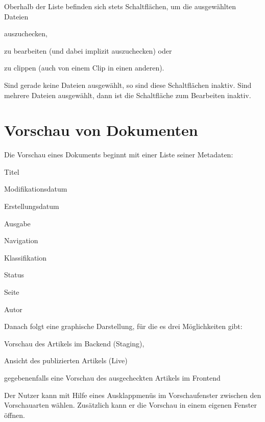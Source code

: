 Oberhalb der Liste befinden sich stets Schaltflächen, um die ausgewählten
Dateien
\begin{compactitem}
\item auszuchecken,
\item zu bearbeiten (und dabei implizit auszuchecken) oder
\item zu clippen (auch von einem Clip in einen anderen).
\end{compactitem}
%
Sind gerade keine Dateien ausgewählt, so sind diese Schaltflächen inaktiv.
Sind mehrere Dateien ausgewählt, dann ist die Schaltfläche zum Bearbeiten
inaktiv.



\section{Vorschau von Dokumenten}

Die Vorschau eines Dokuments beginnt mit einer Liste seiner Metadaten:
\begin{compactitem}
\item Titel
\item Modifikationsdatum 
\item Erstellungsdatum
\item Ausgabe
\item Navigation
\item Klassifikation
\item Status
\item Seite
\item Autor
\end{compactitem}

Danach folgt eine graphische Darstellung, für die es drei Möglichkeiten gibt:
\begin{compactenum}
  \item Vorschau des Artikels im Backend (Staging),
  \item Ansicht des publizierten Artikels (Live)
  \item gegebenenfalls eine Vorschau des ausgecheckten Artikels im Frontend
\end{compactenum}
%
Der Nutzer kann mit Hilfe eines Ausklappmenüs im Vorschaufenster zwischen den
Vorschauarten wählen. Zusätzlich kann er die Vorschau in einem eigenen Fenster
öffnen.
